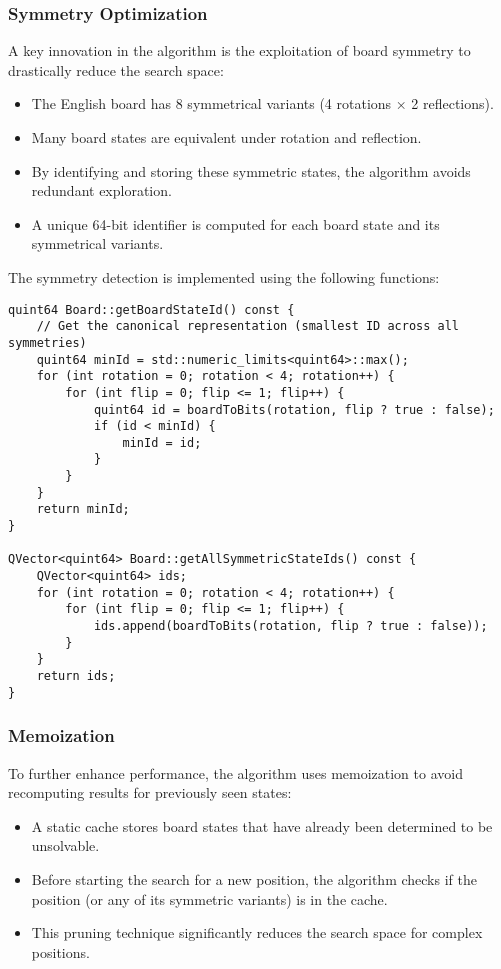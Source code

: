 \subsubsection{Symmetry Optimization}
A key innovation in the algorithm is the exploitation of board symmetry to drastically reduce the search space:
\begin{itemize}
    \item The English board has 8 symmetrical variants (4 rotations × 2 reflections).
    \item Many board states are equivalent under rotation and reflection.
    \item By identifying and storing these symmetric states, the algorithm avoids redundant exploration.
    \item A unique 64-bit identifier is computed for each board state and its symmetrical variants.
\end{itemize}

The symmetry detection is implemented using the following functions:
\begin{verbatim}
quint64 Board::getBoardStateId() const {
    // Get the canonical representation (smallest ID across all symmetries)
    quint64 minId = std::numeric_limits<quint64>::max();
    for (int rotation = 0; rotation < 4; rotation++) {
        for (int flip = 0; flip <= 1; flip++) {
            quint64 id = boardToBits(rotation, flip ? true : false);
            if (id < minId) {
                minId = id;
            }
        }
    }
    return minId;
}

QVector<quint64> Board::getAllSymmetricStateIds() const {
    QVector<quint64> ids;
    for (int rotation = 0; rotation < 4; rotation++) {
        for (int flip = 0; flip <= 1; flip++) {
            ids.append(boardToBits(rotation, flip ? true : false));
        }
    }
    return ids;
}
\end{verbatim}

\subsubsection{Memoization}
To further enhance performance, the algorithm uses memoization to avoid recomputing results for previously seen states:
\begin{itemize}
    \item A static cache stores board states that have already been determined to be unsolvable.
    \item Before starting the search for a new position, the algorithm checks if the position (or any of its symmetric variants) is in the cache.
    \item This pruning technique significantly reduces the search space for complex positions.
\end{itemize}

